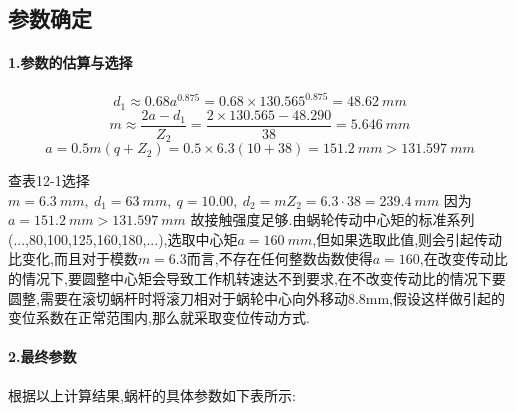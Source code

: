 \documentclass[UTF8,11pt,a4paper,oneside,final,zihao=-4,]{ctexrep}%
\begin{document}
	\subsection{参数确定}
	\paragraph{1.参数的估算与选择}
	$$d_1\approx 0.68a^{0.875}=0.68\times130.565^{0.875}=48.62\ mm$$
	$$m\approx \frac{2a-d_1}{Z_2}=\frac{2\times130.565-48.290}{38}=5.646\ mm$$
	$$a=0.5m(q+Z_2)=0.5\times6.3(10+38)=151.2\ mm>131.597 \ mm$$\par
	查表12-1选择$m=6.3\ mm,\ d_1=63\ mm,\ q=10.00,\ d_2=mZ_2=6.3\cdot38=239.4\ mm$
	因为$a=151.2\ mm>131.597\ mm$	故接触强度足够.由蜗轮传动中心矩的标准系列(...,80,100,125,160,180,...),选取中心矩$a=160\ mm$,但如果选取此值,则会引起传动比变化,而且对于模数$m=6.3$而言,不存在任何整数齿数使得$a=160$,在改变传动比的情况下,要圆整中心矩会导致工作机转速达不到要求,在不改变传动比的情况下要圆整,需要在滚切蜗杆时将滚刀相对于蜗轮中心向外移动8.8mm,假设这样做引起的变位系数在正常范围内,那么就采取变位传动方式.
	\paragraph{2.最终参数} 根据以上计算结果,蜗杆的具体参数如下表所示:
	
	
\end{document}
